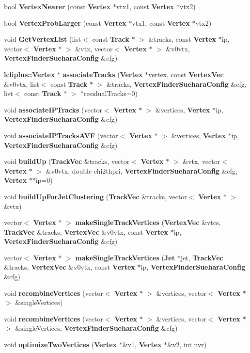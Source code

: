 \begin{DoxyCompactItemize}
\item 
bool {\bf Vertex\-Nearer} (const {\bf Vertex} $\ast$vtx1, const {\bf Vertex} $\ast$vtx2)
\item 
bool {\bf Vertex\-Prob\-Larger} (const {\bf Vertex} $\ast$vtx1, const {\bf Vertex} $\ast$vtx2)
\item 
void {\bf Get\-Vertex\-List} (list$<$ const {\bf Track} $\ast$ $>$ \&tracks, const {\bf Vertex} $\ast$ip, vector$<$ {\bf Vertex} $\ast$ $>$ \&vtx, vector$<$ {\bf Vertex} $\ast$ $>$ \&v0vtx, {\bf Vertex\-Finder\-Suehara\-Config} \&cfg)
\item 
{\bf lcfiplus\-::\-Vertex} $\ast$ {\bf associate\-Tracks} ({\bf Vertex} $\ast$vertex, const {\bf Vertex\-Vec} \&v0vtx, list$<$ const {\bf Track} $\ast$ $>$ \&tracks, {\bf Vertex\-Finder\-Suehara\-Config} \&cfg, list$<$ const {\bf Track} $\ast$ $>$ $\ast$residual\-Tracks=0)
\item 
void {\bf associate\-I\-P\-Tracks} (vector$<$ {\bf Vertex} $\ast$ $>$ \&vertices, {\bf Vertex} $\ast$ip, {\bf Vertex\-Finder\-Suehara\-Config} \&cfg)
\item 
void {\bf associate\-I\-P\-Tracks\-A\-V\-F} (vector$<$ {\bf Vertex} $\ast$ $>$ \&vertices, {\bf Vertex} $\ast$ip, {\bf Vertex\-Finder\-Suehara\-Config} \&cfg)
\item 
void {\bf build\-Up} ({\bf Track\-Vec} \&tracks, vector$<$ {\bf Vertex} $\ast$ $>$ \&vtx, vector$<$ {\bf Vertex} $\ast$ $>$ \&v0vtx, double chi2thpri, {\bf Vertex\-Finder\-Suehara\-Config} \&cfg, {\bf Vertex} $\ast$$\ast$ip=0)
\item 
void {\bf build\-Up\-For\-Jet\-Clustering} ({\bf Track\-Vec} \&tracks, vector$<$ {\bf Vertex} $\ast$ $>$ \&vtx)
\item 
vector$<$ {\bf Vertex} $\ast$ $>$ {\bf make\-Single\-Track\-Vertices} ({\bf Vertex\-Vec} \&vtcs, {\bf Track\-Vec} \&tracks, {\bf Vertex\-Vec} \&v0vtx, const {\bf Vertex} $\ast$ip, {\bf Vertex\-Finder\-Suehara\-Config} \&cfg)
\item 
vector$<$ {\bf Vertex} $\ast$ $>$ {\bf make\-Single\-Track\-Vertices} ({\bf Jet} $\ast$jet, {\bf Track\-Vec} \&tracks, {\bf Vertex\-Vec} \&v0vtx, const {\bf Vertex} $\ast$ip, {\bf Vertex\-Finder\-Suehara\-Config} \&cfg)
\item 
void {\bf recombine\-Vertices} (vector$<$ {\bf Vertex} $\ast$ $>$ \&vertices, vector$<$ {\bf Vertex} $\ast$ $>$ \&single\-Vertices)
\item 
void {\bf recombine\-Vertices} (vector$<$ {\bf Vertex} $\ast$ $>$ \&vertices, vector$<$ {\bf Vertex} $\ast$ $>$ \&single\-Vertices, {\bf Vertex\-Finder\-Suehara\-Config} \&cfg)
\item 
void {\bf optimize\-Two\-Vertices} ({\bf Vertex} $\ast$\&v1, {\bf Vertex} $\ast$\&v2, int nvr)
\end{DoxyCompactItemize}



